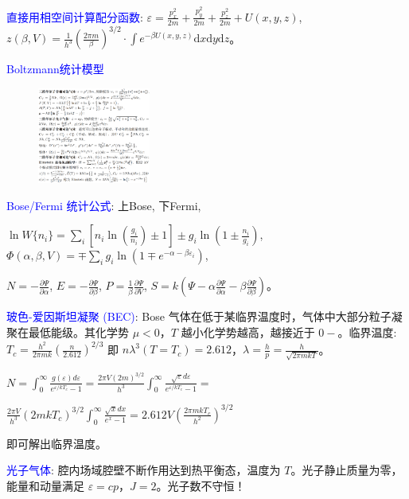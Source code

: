 \documentclass[a4paper,8pt]{extarticle} %
\newcommand{\bluetext}[1]{\textcolor{blue}{#1}}
\begin{document}
\begin{multicols}{3}
\bluetext{直接用相空间计算配分函数}: $\varepsilon = \frac{p_x^2}{2m} + \frac{p_y^2}{2m} + \frac{p_z^2}{2m} + U(x,y,z)$, $z(\beta,V) = \frac{1}{h^3}\left(\frac{2\pi m}{\beta}\right)^{3/2}\cdot\int e^{-\beta U(x,y,z)}\mathrm{d}x\mathrm{d}y\mathrm{d}z$。

\bluetext{Boltzmann统计模型}
\begin{figure}[H]
    \vspace{-0.3cm}
    \centering
    \includegraphics[width=0.33\textwidth]{images/3.png}
    \vspace{-0.6cm}
\end{figure}

\bluetext{Bose/Fermi 统计公式}: 上Bose, 下Fermi,

$\ln W\{n_i\} = \sum_i \left[n_i\ln\left(\frac{g_i}{n_i}\right) \pm 1\right] \pm g_i\ln\left(1 \pm \frac{n_i}{g_i}\right)$,
$\Phi(\alpha,\beta,V) = \mp \sum_i g_i\ln\left(1 \mp e^{-\alpha-\beta\varepsilon_i}\right)$,

$N = -\frac{\partial\Psi}{\partial\alpha}$, $E = -\frac{\partial\Psi}{\partial\beta}$, $P = \frac{1}{\beta}\frac{\partial\Psi}{\partial V}$, $S = k\left(\Psi - \alpha\frac{\partial\Psi}{\partial\alpha} - \beta\frac{\partial\Psi}{\partial\beta}\right)$。

\bluetext{玻色-爱因斯坦凝聚 (BEC)}: Bose 气体在低于某临界温度时，气体中大部分粒子凝聚在最低能级。其化学势 $\mu < 0$，$T$ 越小化学势越高，越接近于 $0-$。临界温度: $T_c = \frac{h^2}{2\pi mk}\left(\frac{n}{2.612}\right)^{2/3}$ 即 $n\lambda^3(T=T_c) = 2.612$，$\lambda = \frac{h}{p} = \frac{h}{\sqrt{2\pi mkT}}$。

$N = \int_0^{\infty}\frac{g(\varepsilon)d\varepsilon}{e^{\varepsilon/kT_c}-1} = \frac{2\pi V(2m)^{3/2}}{h^3}\int_0^{\infty}\frac{\sqrt{\varepsilon}d\varepsilon}{e^{\varepsilon/kT_c}-1}=$

$\frac{2\pi V}{h^3}(2mkT_c)^{3/2}\int_0^{\infty}\frac{\sqrt{x}dx}{e^x-1} = 2.612V\left(\frac{2\pi mkT_c}{h^2}\right)^{3/2}$

即可解出临界温度。

\bluetext{光子气体}: 腔内场域腔壁不断作用达到热平衡态，温度为 $T$。光子静止质量为零，能量和动量满足 $\varepsilon = cp$，$J = 2$。光子数不守恒！


\end{multicols}
\end{document}
